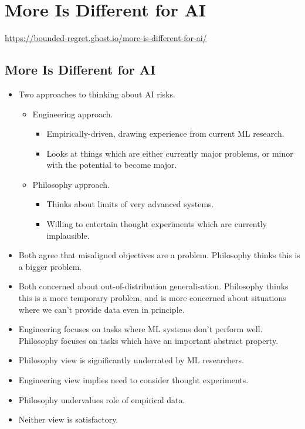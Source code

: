 \section{More Is Different for AI}

\url{https://bounded-regret.ghost.io/more-is-different-for-ai/}


\subsection{More Is Different for AI}

\begin{itemize}
    \item Two approaches to thinking about AI risks.
    \begin{itemize}
        \item Engineering approach.
        \begin{itemize}
            \item Empirically-driven, drawing experience from current ML research.
            \item Looks at things which are either currently major problems, or minor with the potential to become major.
        \end{itemize}
        \item Philosophy approach.
        \begin{itemize}
            \item Thinks about limits of very advanced systems.
            \item Willing to entertain thought experiments which are currently implausible.
        \end{itemize}
    \end{itemize}
    \item Both agree that misaligned objectives are a problem. Philosophy thinks this is a bigger problem.
    \item Both concerned about out-of-distribution generalisation. Philosophy thinks this is a more temporary problem, and is more concerned about situations where we can't provide data even in principle.
    \item Engineering focuses on tasks where ML systems don't perform well. Philosophy focuses on tasks which have an important abstract property.
    \item Philosophy view is significantly underrated by ML researchers.
    \item Engineering view implies need to consider thought experiments.
    \item Philosophy undervalues role of empirical data.
    \item Neither view is satisfactory.
\end{itemize}


